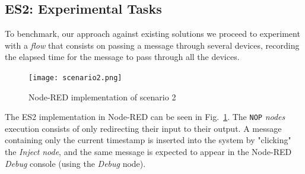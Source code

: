 
\subsection{ES2: Experimental Tasks}\label{sec:discussion_scenario2}

To benchmark, our approach against existing solutions we proceed to experiment with a \textit{flow} that consists on passing a message through several devices, recording the elapsed time for the message to pass through all the devices.

\begin{figure}[h]
\centering
\texttt{[image: scenario2.png]}
\caption[Node-RED implementation of scenario 2]{Node-RED implementation of scenario 2}\label{fig:scenario2_node_red}
\end{figure}

The ES2 implementation in Node-RED can be seen in Fig.~\ref{fig:scenario2_node_red}. The \texttt{NOP} \textit{nodes} execution consists of only redirecting their input to their output. A message containing only the current timestamp is inserted into the system by "clicking" the \textit{Inject} \textit{node}, and the same message is expected to appear in the Node-RED \textit{Debug} console (using the \textit{Debug} node).

\captionsetup{belowskip=12pt,aboveskip=4pt}
\begin{table}[ht]
    \centering
    \caption{Scenario 2 results}
    \label{tab:scenario2_table}
\end{table}{}

